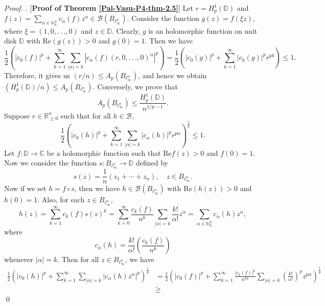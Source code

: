 \documentclass[a4paper,12pt]{amsart}
\theoremstyle{definition}
\newenvironment{pf}[1][]{%
 \vskip 3mm
 \noindent
 \ifthenelse{\equal{#1}{}}%
  {{\slshape Proof. }}%
  {{\slshape #1.} }%
 }%
{\qed\bigskip}
\begin{document}
\begin{pf} [{\bf Proof of Theorem \ref{Pal-Vasu-P4-thm-2.5}}]
	Let $r=H^1_{p}(\mathbb{D})$ and $f(z)=\sum_{\alpha\in \mathbb{N}^n_{0}}c_{\alpha}(f)z^{\alpha} \in \mathcal{B}(B_{\ell^n_{\infty}})$. Consider the function $g(z)=f(\xi z)$, where $\xi=(1, 0,.\,.\,.,0)$ and $z\in \mathbb{D}$. Clearly, $g$ is an holomorphic function on unit disk $\mathbb{D}$ with $\mbox{Re}(g(z))>0$ and $g(0)=1$. 
	Then we have 
	\begin{equation*}
		\frac{1}{2}\left(|c_0(f)|^p + \sum_{k=1}^{\infty}\sum_{|\alpha|=k}|c_{\alpha}(f)(r,0,.\,.\,.,0)^{\alpha}|^{p}\right)= \frac{1}{2}\left(|c_0(g)|^p + \sum_{k=1}^{\infty}|c_k(g)|^pr^{pk}\right)\leq 1.
	\end{equation*}
	Therefore, it gives us $(r/n)\leq A_p(B_{\ell^n_{\infty}})$, and hence we obtain $	(H^1_p(\mathbb{D})/n) \leq A_p(B_{\ell^n_{\infty}}).$ Conversely, we prove that 
	\begin{equation*}
		A_p(B_{\ell^n_{\infty}}) \leq \frac{H^1_p(\mathbb{D})}{n^{1/p-1}}.
	\end{equation*}
	Suppose $r\in \mathbb{R}^n_{\geq 0}$ such that for all $h \in \mathcal{B}$,
	\begin{equation*}
		\frac{1}{2}\left(|c_0(h)|^p + \sum_{k=1}^{\infty}\sum_{|\alpha|=k}|c_{\alpha}(h)|^pr^{p\alpha}\right)^{\frac{1}{p}} \leq 1.
	\end{equation*}
	Let $f:\mathbb{D}\rightarrow\mathbb{C}$ be a holomorphic function such that $\mbox{Re} f(z)>0$ and $f(0)=1$. Now we consider the function $s: B_{\ell^n_{\infty}}\rightarrow \mathbb{D}$ defined by 
	\begin{equation*}
		s(z)=\frac{1}{n}(z_1+\cdots+z_n),\quad z\in B_{\ell^n_{\infty}}.
	\end{equation*}
	Now if we set $h=f\circ s$, then we have $h\in \mathcal{B}(B_{\ell^n_{\infty}})$ with $\mbox{Re}(h(z))>0$ and $h(0)=1$. Also, for each $z\in B_{\ell^n_{\infty}}$,
	\begin{equation*}
		h(z)=\sum_{k=1}^{\infty}c_k(f)s(z)^k=\sum_{k=0}^{\infty}\frac{c_k(f)}{n^k}\sum_{|\alpha|=k}\frac{k!}{\alpha!}z^{\alpha}=\sum_{\alpha\in \mathbb{N}^n_{0}}c_{\alpha}(h)z^{\alpha},
	\end{equation*}
	where 
	\begin{equation*}
		c_{\alpha}(h)=\frac{k!}{\alpha!}\left(\frac{c_k(f)}{n^k}\right)
	\end{equation*}
	whenever $|\alpha|=k$. Then for all $z\in B_{\ell^n_{\infty}}$, we have
	\begin{align*}
		\frac{1}{2}\left(|c_0(h)|^p + \sum_{k=1}^{\infty}\sum_{|\alpha|=k}|c_{\alpha}(h)z^{\alpha}|^p\right)^{\frac{1}{p}} & = \frac{1}{2}\left(|c_0(f)|^p+ \sum_{k=1}^{\infty}\frac{|c_k(f)|^p}{n^{kp}}\sum_{|\alpha|=k}\left(\frac{k!}{\alpha!}\right)^{p} z^{p\alpha}\right)^{\frac{1}{p}}\\[2mm] & \geq 

\end{align*}
\end{pf}
\end{document}
